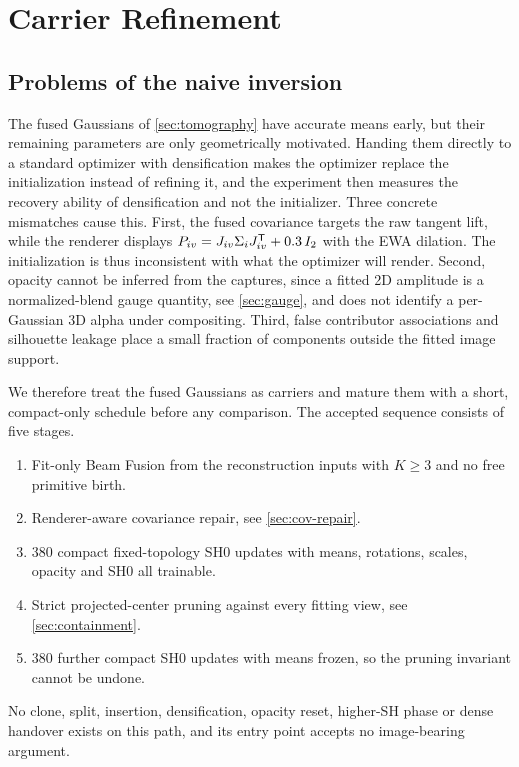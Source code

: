 \section{Carrier Refinement}
\label{sec:refinement}

\subsection{Problems of the naive inversion}
\label{sec:naive-problems}

The fused Gaussians of \cref{sec:tomography} have accurate means early, but their
remaining parameters are only geometrically motivated.  Handing them directly to a
standard optimizer with densification makes the optimizer replace the initialization
instead of refining it, and the experiment then measures the recovery ability of
densification and not the initializer.  Three concrete mismatches cause this.  First, the
fused covariance targets the raw tangent lift, while the renderer displays
$P_{iv} = J_{iv} \Sigma_i J_{iv}^{\mathsf{T}} + 0.3\,I_2$ with the EWA dilation.  The initialization
is thus inconsistent with what the optimizer will render.  Second, opacity cannot be
inferred from the captures, since a fitted 2D amplitude is a normalized-blend gauge
quantity, see \cref{sec:gauge}, and does not identify a per-Gaussian 3D alpha under
compositing.  Third, false contributor associations and silhouette leakage place a small
fraction of components outside the fitted image support.

We therefore treat the fused Gaussians as carriers and mature them with a short,
compact-only schedule before any comparison.  The accepted sequence consists of five
stages.
\begin{enumerate}[leftmargin=1.6em,itemsep=1pt]
  \item Fit-only Beam Fusion from the reconstruction inputs with $K \ge 3$ and no free
        primitive birth.
  \item Renderer-aware covariance repair, see \cref{sec:cov-repair}.
  \item 380 compact fixed-topology SH0 updates with means, rotations, scales, opacity and
        SH0 all trainable.
  \item Strict projected-center pruning against every fitting view, see
        \cref{sec:containment}.
  \item 380 further compact SH0 updates with means frozen, so the pruning invariant cannot
        be undone.
\end{enumerate}
No clone, split, insertion, densification, opacity reset, higher-SH phase or dense
handover exists on this path, and its entry point accepts no image-bearing argument.

